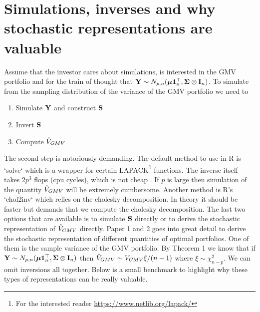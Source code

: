 \documentclass[]{book}\usepackage{knitr}
\begin{document}
\section{Simulations, inverses and why stochastic representations are valuable}
Assume that the investor cares about simulations, is interested in the GMV portfolio and for the train of thought that $\mathbf{Y} \sim N_{p,n}(\mbox{\boldmath$\mu$} \mathbf{1}_n^\top, \mathbf{\Sigma} \otimes \mathbf{I}_n)$. To simulate from the sampling distribution of the variance of the GMV portfolio we need to 
\begin{enumerate}
  \item Simulate $\mathbf{Y}$ and construct $\mathbf{S}$
  \item Invert $\mathbf{S}$
  \item Compute $\hat{V}_{GMV}$
\end{enumerate}
The second step is notoriously demanding.
The default method to use in R is `solve` which is a wrapper for certain LAPACK\footnote{For the interested reader \url{https://www.netlib.org/lapack/}} functions.
The inverse itself takes $2p^3$ flops (cpu cycles), which is not cheap \citet[ch 14]{higham2002accuracy}.
If $p$ is large then simulation of the quantity $\hat{V}_{GMV}$ will be extremely cumbersome.
Another method is R's `chol2inv` which relies on the cholesky decomposition. 
In theory it should be faster but demands that we compute the cholesky decomposition.
The last two options that are available is to simulate $\mathbf{S}$ directly or to derive the stochastic representation of $\hat{V}_{GMV}$ directly.
Paper 1 and 2 goes into great detail to derive the stochastic representation of different quantities of optimal portfolios. 
One of them is the sample variance of the GMV portfolio.
By Theorem 1 \citet{bodnar2020sampling} we know that if $\mathbf{Y} \sim N_{p,n}(\mbox{\boldmath$\mu$} \mathbf{1}_n^\top, \mathbf{\Sigma} \otimes \mathbf{I}_n)$ then $\hat{V}_{GMV} \sim V_{GMV}\xi /(n-1)$ where $\xi \sim \chi^2_{n-p}$.
We can omit inversions all together.
Below is a small benchmark to highlight why these types of representations can be really valuable.
\end{document}
